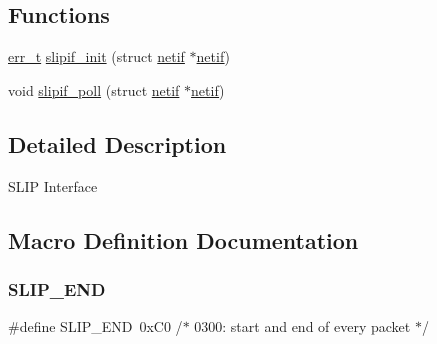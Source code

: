 \subsection*{Functions}
\begin{DoxyCompactItemize}
\item 
\hyperlink{group__infrastructure__errors_gaf02d9da80fd66b4f986d2c53d7231ddb}{err\+\_\+t} \hyperlink{openmote-cc2538_2lwip_2src_2netif_2slipif_8c_a687973ba82dab13a5b9d38d7399aeee3}{slipif\+\_\+init} (struct \hyperlink{structnetif}{netif} $\ast$\hyperlink{structnetif}{netif})
\item 
void \hyperlink{openmote-cc2538_2lwip_2src_2netif_2slipif_8c_a7b036fd1cde9b299139cac62f52d15a6}{slipif\+\_\+poll} (struct \hyperlink{structnetif}{netif} $\ast$\hyperlink{structnetif}{netif})
\end{DoxyCompactItemize}


\subsection{Detailed Description}
S\+L\+IP Interface 

\subsection{Macro Definition Documentation}
\mbox{\label{openmote-cc2538_2lwip_2src_2netif_2slipif_8c_ac08c4b8e75c6456f5654145f8b001005}} 
\subsubsection{\texorpdfstring{S\+L\+I\+P\+\_\+\+E\+ND}{SLIP\_END}}
{\footnotesize\ttfamily \#define S\+L\+I\+P\+\_\+\+E\+ND~0x\+C0 /$\ast$ 0300\+: start and end of every packet $\ast$/}

\mbox{\label{openmote-cc2538_2lwip_2src_2netif_2slipif_8c_a379cfa838122508f0e88fbbe8ce80c47}} 
